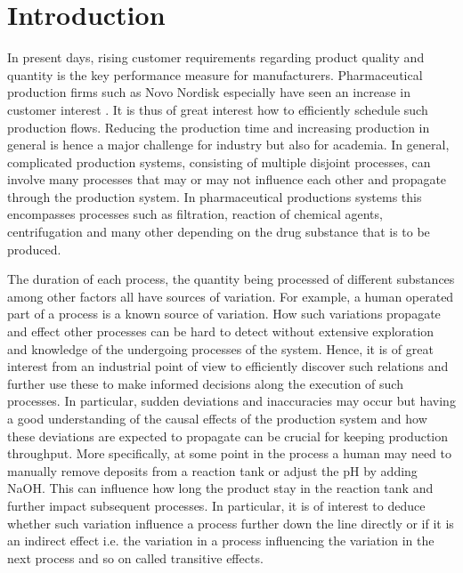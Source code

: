 \documentclass[../Thesis.tex]{subfiles}
\begin{document}

\chapter{Introduction}
In present days, rising customer requirements regarding product quality and quantity is the key performance measure for manufacturers. Pharmaceutical production firms such as Novo Nordisk especially have seen an increase in customer interest  \cite{NOVO_Wegovy_update}. It is thus of great interest how to efficiently schedule such production flows. Reducing the production time and increasing production in general is hence a major challenge for industry but also for academia. In general, complicated production systems, consisting of multiple disjoint processes, can involve many processes that may or may not influence each other and propagate through the production system. In pharmaceutical productions systems this encompasses processes such as filtration, reaction of chemical agents, centrifugation and many other depending on the drug substance that is to be produced.

The duration of each process, the quantity being processed of different substances among other factors all have sources of variation. For example, a human operated part of a process is a known source of variation. How such variations propagate and effect other processes can be hard to detect without extensive exploration and knowledge of the undergoing processes of the system. Hence, it is of great interest from an industrial point of view to efficiently discover such relations and further use these to make informed decisions along the execution of such processes. In particular, sudden deviations and inaccuracies may occur but having a good understanding of the causal effects of the production system and how these deviations are expected to propagate can be crucial for keeping production throughput. More specifically, at some point in the process a human may need to manually remove deposits from a reaction tank or adjust the pH by adding NaOH. This can influence how long the product stay in the reaction tank and further impact subsequent processes. In particular, it is of interest to deduce whether such variation influence a process further down the line directly or if it is an indirect effect i.e. the variation in a process influencing the variation in the next process and so on called transitive effects.
\end{document}
